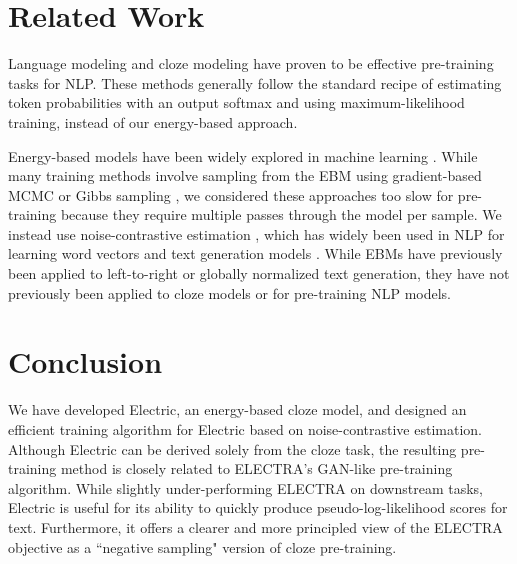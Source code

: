 \documentclass[11pt,a4paper]{article}
\begin{document}
\section{Related Work}


Language modeling \cite{dai2015semi,radford2018improving,peters2018deep} and cloze modeling \cite{devlin2018bert,baevski2019cloze,liu2019roberta} have proven to be effective pre-training tasks for NLP.
These methods generally follow the standard recipe of estimating token probabilities with an output softmax and using maximum-likelihood training, instead of our energy-based approach.

Energy-based models have been widely
explored in machine learning \citep{Dayan1995TheHM,LeCun2006ATO}.
While many training methods involve sampling from the EBM using gradient-based MCMC \citep{Du2019ImplicitGA} or Gibbs sampling \citep{Hinton2002TrainingPO}, we considered these approaches too slow for pre-training because they require multiple passes through the model per sample.
We instead use noise-contrastive estimation \citep{Gutmann2010NoisecontrastiveEA}, which has widely been used in NLP for learning word vectors \cite{Mnih2013LearningWE} and text generation models \cite{Jean2014OnUV, Jzefowicz2016ExploringTL}.
While EBMs have previously been applied to left-to-right \citep{Wang2015TransdimensionalRF} or globally normalized \citep{Rosenfeld2001WholesentenceEL, Deng2020ResidualEM} text generation, they have not previously been applied to cloze models or for pre-training NLP models. 

\section{Conclusion}
We have developed Electric, an energy-based cloze model, and designed an efficient training algorithm for Electric based on noise-contrastive estimation.
Although Electric can be derived solely from the cloze task, the resulting pre-training method is closely related to ELECTRA's GAN-like pre-training algorithm.
While slightly under-performing ELECTRA on downstream tasks, Electric is useful for its ability to quickly produce pseudo-log-likelihood scores for text. 
Furthermore, it offers a clearer and more principled view of the ELECTRA objective as a ``negative sampling" version of cloze pre-training. 
\end{document}
